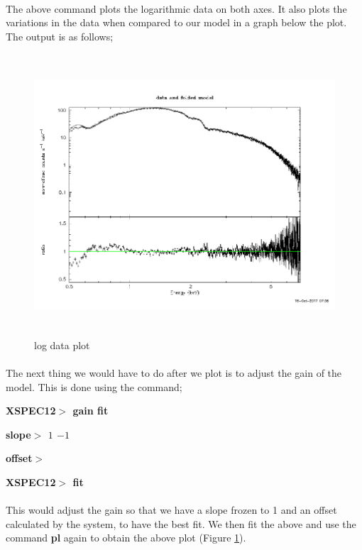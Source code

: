 \documentclass[a4paper,twoside]{report}
\numberwithin{equation}{section}
\begin{document}
\paragraph{}
The above command plots the logarithmic data on both axes. It also plots the variations in the data when compared to our model in a graph below the plot. The output is as follows;
\begin{figure}[h]
\includegraphics[width=1.0\linewidth, height=10.5cm]{7.jpg}
\caption{log data plot}
\label{log_dp}
\end{figure}
\paragraph{}
The next thing we would have to do after we plot is to adjust the gain of the model. This is done using the command; 
\begin{center}
\item \large \textbf{XSPEC12$>$ gain fit}
\item \large \textbf{slope$>$ $1$ $-1$}
\item \large \textbf{offset$>$   }
\item \large \textbf{XSPEC12$>$ fit}
\end{center}
\paragraph{}
This would adjust the gain so that we have a slope frozen to 1 and an offset calculated by the system, to have the best fit. We then fit the above and use the command \textbf{pl} again to obtain the above plot (Figure \ref{log_dp}). 
\end{document}
